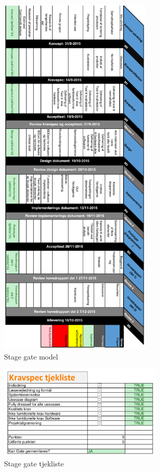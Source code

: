 \begin{figure}[H]
	\centering
	\includegraphics[width=0.65\textwidth]{billeder/Hovedrapport/Stage-gatel.PDF}
	\caption{Stage gate model}
	\label{fig:stage-gate}
\end{figure}

\begin{figure}[H]
	\centering
	\includegraphics[width=0.7\textwidth]{billeder/Hovedrapport/Stagegatetjekliste.PDF}
	\caption{Stage gate tjekliste}
	\label{fig:stage-gate-tjekliste}
\end{figure}

